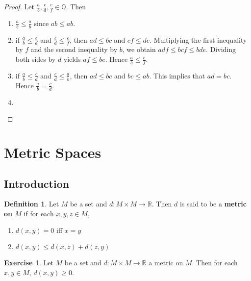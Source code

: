\documentclass[12pt]{amsart}
\theoremstyle{definition}
\newtheorem{defn}[definition]{Definition}
\newtheorem{ex}[definition]{Exercise}
\newcommand{\R}{\mathbb{R}}
\newcommand{\Q}{\mathbb{Q}}
\newcommand{\lex}[1]{\label{ex:#1}}
\newcommand{\ld}[1]{\label{defn:#1}}
\begin{document}
	\begin{proof} Let $\frac{a}{b}, \frac{c}{d}, \frac{e}{f} \in \Q$. Then
		\begin{enumerate}
			\item  $\frac{a}{b} \leq \frac{a}{b}$ since $ab \leq ab$. 
			\item if $\frac{a}{b} \leq \frac{c}{d}$ and $\frac{c}{d} \leq  \frac{e}{f}$, then $ad \leq bc$ and $ cf \leq de$. Multiplying the first inequality by $f$ and the second inequality by $b$, we obtain $adf \leq bcf \leq bde$. Dividing both sides by $d$ yields $af \leq be$. Hence $\frac{a}{b} \leq \frac{e}{f}$. 
			\item if $\frac{a}{b} \leq \frac{c}{d}$ and $\frac{c}{d} \leq \frac{a}{b}$, then $ad \leq bc$ and $bc \leq ab$. This implies that $ad = bc$. Hence $\frac{a}{b} = \frac{c}{d}$.
			\item 
		\end{enumerate}
	\end{proof}
	
	
	
	
	
	
	
	
	
	
	
	
	
	
	
	
	
	\newpage
	\section{Metric Spaces}
	\subsection{Introduction}
	\begin{defn} \ld{}
	Let $M$ be a set and $d: M \times M \rightarrow \R$. Then $d$ is said to be a \textbf{metric on $M$} if for each $x,y,z \in M$, 
	\begin{enumerate}
	\item $d(x,y) = 0$ iff $x = y$
	\item $d(x, y) \leq d(x, z) + d(z, y)$
\end{enumerate}	 
	\end{defn}	
	
	\begin{ex} \lex{}
	Let $M$ be a set and $d: M \times M \rightarrow \R$ a metric on $M$. Then for each $x,y \in M$, $d(x,y) \geq 0$. 
	\end{ex}
	
\end{document}

